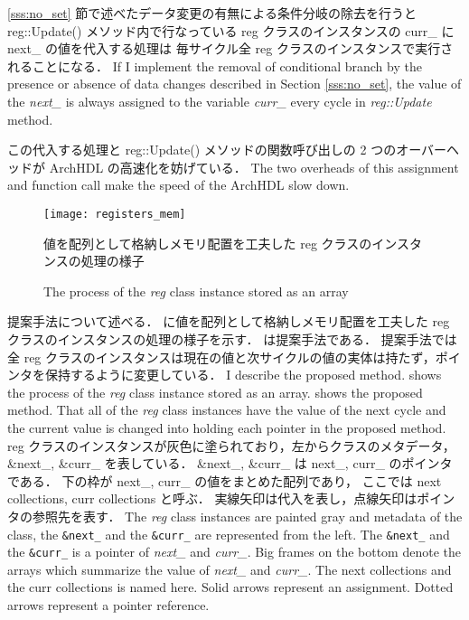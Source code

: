 \ref{sss:no_set} 節で述べたデータ変更の有無による条件分岐の除去を行うと reg::Update() メソッド内で行なっている
reg クラスのインスタンスの curr\_ に next\_ の値を代入する処理は
毎サイクル全 reg クラスのインスタンスで実行されることになる．
\fi
If I implement the removal of conditional branch by the presence or absence of data changes described in Section \ref{sss:no_set},
the value of the \textit{next\_} is always assigned to the variable \textit{curr\_} every cycle in \textit{reg::Update} method.

この代入する処理と reg::Update() メソッドの関数呼び出しの 2 つのオーバーヘッドが ArchHDL の高速化を妨げている．
\fi
The two overheads of this assignment and function call make the speed of the ArchHDL slow down.

\begin{figure}[t]
 \centering
 \texttt{[image: registers\_mem]}
 \caption{値を配列として格納しメモリ配置を工夫した reg クラスのインスタンスの処理の様子}
\fi
 \caption{The process of the \textit{reg} class instance stored as an array}
 \label{fig:mem_copy}
\end{figure}

提案手法について述べる．
 に値を配列として格納しメモリ配置を工夫した reg クラスのインスタンスの処理の様子を示す．
 は提案手法である．
提案手法では全 reg クラスのインスタンスは現在の値と次サイクルの値の実体は持たず，ポインタを保持するように変更している．
\fi
I describe the proposed method.
 shows the process of the \textit{reg} class instance stored as an array.
 shows the proposed method.
That all of the \textit{reg} class instances have the value of the next cycle and the current value is changed into holding each pointer in the proposed method.
reg クラスのインスタンスが灰色に塗られており，左からクラスのメタデータ，\&next\_, \&curr\_ を表している．
\&next\_, \&curr\_ は next\_, curr\_ のポインタである．
下の枠が next\_, curr\_ の値をまとめた配列であり，
ここでは next collections, curr collections と呼ぶ．
実線矢印は代入を表し，点線矢印はポインタの参照先を表す．
\fi
The \textit{reg} class instances are painted gray
and metadata of the class, the \texttt{\&next\_} and the \texttt{\&curr\_} are represented from the left.
The \texttt{\&next\_} and the \texttt{\&curr\_} is a pointer of \textit{next\_} and \textit{curr\_}.
Big frames on the bottom denote the arrays which summarize the value of \textit{next\_} and \textit{curr\_}.
The next collections and the curr collections is named here.
Solid arrows represent an assignment.
Dotted arrows represent a pointer reference.


